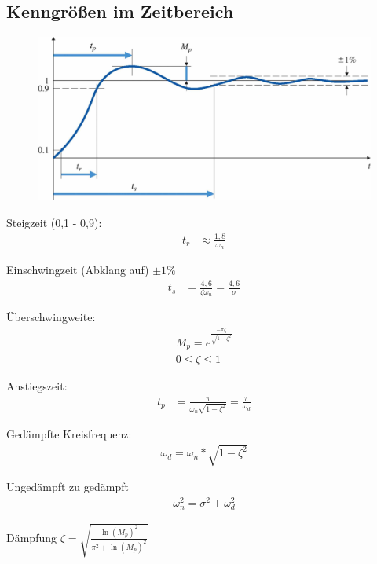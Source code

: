 \subsection{Kenngrößen im Zeitbereich}
\begin{tcolorbox}[colback=white!10!white,
                  colframe=green!30!black,
                  title=Kenngrößen] 
    \begin{figure}[H]
        \includegraphics[width=1\linewidth]{images/numb}
    \end{figure}
\begin{minipage}{.45\textwidth}
        Steigzeit (0,1 - 0,9):
    \begin{align*}
        t_r &\approx \frac{1,8}{\omega_n} 
    \end{align*}
\end{minipage}
\begin{minipage}{.45\textwidth}
 Einschwingzeit (Abklang auf) $\pm 1\%$
 \begin{align*}
 t_s  &= \frac{4,6}{\zeta\omega_n} = \frac{4,6}{\sigma}
 \end{align*}
\end{minipage}
\begin{minipage}{.45\textwidth}
 Überschwingweite:
 \begin{align*}
 M_p = e^{\frac{-\pi \zeta}{\sqrt{1-\zeta^2}}} \\ 0 \leq \zeta \leq 1
 \end{align*}
\end{minipage}
\begin{minipage}{.45\textwidth}
 Anstiegszeit:
 \begin{align*}
 t_p &= \frac{\pi}{\omega_n \sqrt{1-\zeta^2}} =\frac{\pi}{\omega_d}
 \end{align*}
\end{minipage}    
\begin{minipage}{.45\textwidth}
    Gedämpfte Kreisfrequenz:
    \begin{align*}
        \omega_d = \omega_n*\sqrt{1-\zeta^2}
    \end{align*}
\end{minipage}
\begin{minipage}{.45\textwidth}
    Ungedämpft zu gedämpft
    \begin{align*}
    \omega_n^2 = \sigma^2+\omega_d^2
    \end{align*}
\end{minipage}
    Dämpfung $\zeta = \sqrt{\frac{\ln(M_p)^2}{\pi^2+\ln(M_p)^2}}$
\end{tcolorbox}

